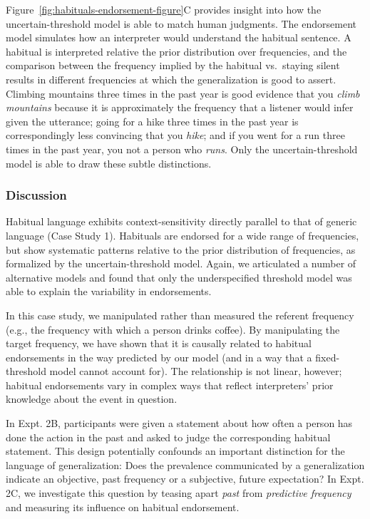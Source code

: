 \documentclass[english,,man,floatsintext]{apa6}
\theoremstyle{definition}
\theoremstyle{definition}
\theoremstyle{definition}
\theoremstyle{remark}
\begin{document}
Figure~\ref{fig:habituals-endorsement-figure}C provides insight into how
the uncertain-threshold model is able to match human judgments. The
endorsement model simulates how an interpreter would understand the
habitual sentence. A habitual is interpreted relative the prior
distribution over frequencies, and the comparison between the frequency
implied by the habitual vs.~staying silent results in different
frequencies at which the generalization is good to assert. Climbing
mountains three times in the past year is good evidence that you
\emph{climb mountains} because it is approximately the frequency that a
listener would infer given the utterance; going for a hike three times
in the past year is correspondingly less convincing that you
\emph{hike}; and if you went for a run three times in the past year, you
not a person who \emph{runs}. Only the uncertain-threshold model is able
to draw these subtle distinctions.

\hypertarget{discussion-1}{%
\subsubsection{Discussion}\label{discussion-1}}

Habitual language exhibits context-sensitivity directly parallel to that
of generic language (Case Study 1). Habituals are endorsed for a wide
range of frequencies, but show systematic patterns relative to the prior
distribution of frequencies, as formalized by the uncertain-threshold
model. Again, we articulated a number of alternative models and found
that only the underspecified threshold model was able to explain the
variability in endorsements.

In this case study, we manipulated rather than measured the referent
frequency (e.g., the frequency with which a person drinks coffee). By
manipulating the target frequency, we have shown that it is causally
related to habitual endorsements in the way predicted by our model (and
in a way that a fixed-threshold model cannot account for). The
relationship is not linear, however; habitual endorsements vary in
complex ways that reflect interpreters' prior knowledge about the event
in question.

In Expt. 2B, participants were given a statement about how often a
person has done the action in the past and asked to judge the
corresponding habitual statement. This design potentially confounds an
important distinction for the language of generalization: Does the
prevalence communicated by a generalization indicate an objective, past
frequency or a subjective, future expectation? In Expt. 2C, we
investigate this question by teasing apart \emph{past} from
\emph{predictive frequency} and measuring its influence on habitual
endorsement.
\end{document}
